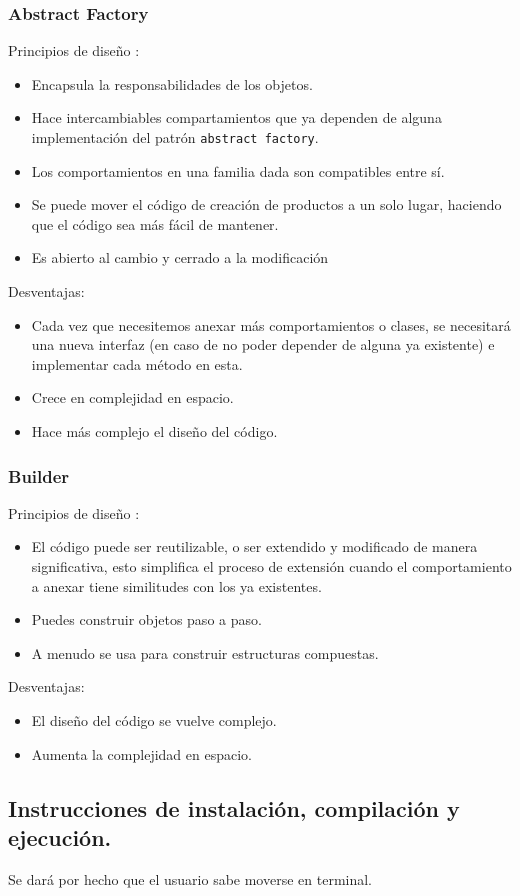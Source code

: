 \documentclass{article}
\newcommand{\code}[1]{\textcolor{white!25!black}{\texttt{#1}}}
\begin{document}
\subsubsection*{Abstract Factory}
Principios de diseño :
\begin{itemize}
\item Encapsula la responsabilidades de los objetos.
\item Hace intercambiables compartamientos que ya dependen de alguna implementación del patrón
  \code{abstract factory}.
\item Los comportamientos en una familia dada son compatibles entre sí.
\item Se puede mover el código de creación de productos a un solo lugar,
  haciendo que el código sea más fácil de mantener.
\item Es abierto al cambio y cerrado a la modificación
\end{itemize}
Desventajas:
\begin{itemize}
\item Cada vez que necesitemos anexar más comportamientos o clases, se necesitará una nueva
  interfaz (en caso de no poder depender de alguna ya existente) e implementar cada método
  en esta.
\item Crece en complejidad en espacio.
\item Hace más complejo el diseño del código.
\end{itemize}
\subsubsection*{Builder}
Principios de diseño :
\begin{itemize}
\item El código puede ser reutilizable, o ser extendido y modificado de manera significativa,
  esto simplifica el proceso de extensión cuando el comportamiento a anexar tiene similitudes
  con los ya existentes.
\item Puedes construir objetos paso a paso.
\item A menudo se usa para construir estructuras compuestas.
\end{itemize}
Desventajas:
\begin{itemize}
\item El diseño del código se vuelve complejo.
\item Aumenta la complejidad en espacio.
\end{itemize}


\subsection*{Instrucciones de instalación, compilación y ejecución.}
Se dará por hecho que el usuario sabe moverse en terminal.\\
\end{document}
